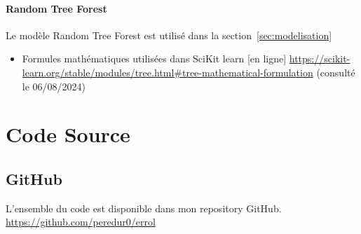 \documentclass[a4paper,12pt]{article}
\begin{document}
			\paragraph{Random Tree Forest}
				Le modèle Random Tree Forest est utilisé dans la section~\ref{sec:modelisation}
				\begin{itemize}
					\item Formules mathématiques utilisées dans SciKit learn [en ligne] \url{https://scikit-learn.org/stable/modules/tree.html#tree-mathematical-formulation} (consulté le 06/08/2024)
				\end{itemize}

	\section{Code Source}
		\subsection{GitHub}
			L'ensemble du code est disponible dans mon repository GitHub. \url{https://github.com/peredur0/errol}
	
\end{document}
